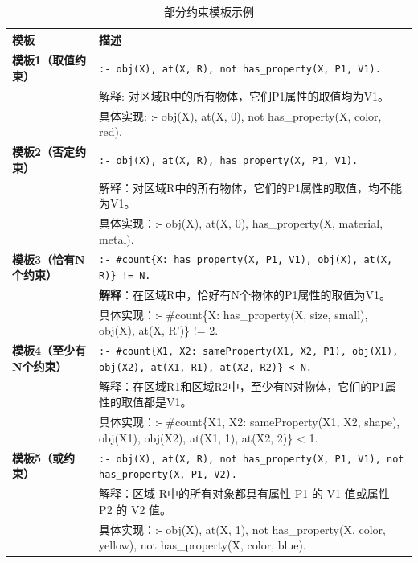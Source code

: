 \begin{table}[h]
    \centering
    \renewcommand{\arraystretch}{1.0}
    \begin{tabular}{|p{3cm}|p{12cm}|}
        \hline
        \textbf{模板} & \textbf{描述} \\
        \hline
        \textbf{模板1（取值约束）} & 
        \texttt{:- obj(X), at(X, R), not has\_property(X, P1, V1).} \\ 
        & 解释: 对区域R中的所有物体，它们P1属性的取值均为V1。 \\ 
        & 具体实现: :- obj(X), at(X, 0), not has\_property(X, color, red). \\
        \hline
        
        \textbf{模板2（否定约束）} & 
        \texttt{:- obj(X), at(X, R), has\_property(X, P1, V1).} \\ 
        & 解释：对区域R中的所有物体，它们的P1属性的取值，均不能为V1。 \\ 
        & 具体实现：:- obj(X), at(X, 0), has\_property(X, material, metal). \\
        \hline
        
        \textbf{模板3（恰有N个约束）} & 
        \texttt{:- \#count\{X: has\_property(X, P1, V1), obj(X), at(X, R)\} != N.} \\ 
        & \textbf{解释}：在区域R中，恰好有N个物体的P1属性的取值为V1。 \\ 
        & 具体实现：:- \#count\{X: has\_property(X, size, small), obj(X), at(X, R')\} != 2. \\
        \hline
        
        \textbf{模板4（至少有N个约束）} & 
        \texttt{:- \#count\{X1, X2: sameProperty(X1, X2, P1), obj(X1), obj(X2), at(X1, R1), at(X2, R2)\} < N.} \\ 
        & 解释：在区域R1和区域R2中，至少有N对物体，它们的P1属性的取值都是V1。 \\ 
        & 具体实现：:- \#count\{X1, X2: sameProperty(X1, X2, shape), obj(X1), obj(X2), at(X1, 1), at(X2, 2)\} < 1. \\
        \hline
        
        \textbf{模板5（或约束）} & 
        \texttt{:- obj(X), at(X, R), not has\_property(X, P1, V1), not has\_property(X, P1, V2).} \\ 
        & 解释：区域 R中的所有对象都具有属性 P1 的 V1 值或属性 P2 的 V2 值。 \\ 
        & 具体实现：:- obj(X), at(X, 1), not has\_property(X, color, yellow), not has\_property(X, color, blue). \\
        \hline
    \end{tabular}
    \caption{部分约束模板示例}
    \label{tab:asp_templates}
\end{table}

